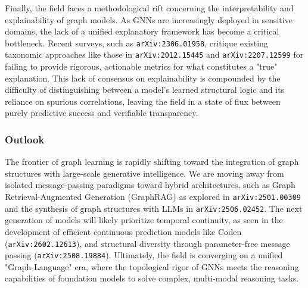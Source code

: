 \documentclass[11pt]{article}
\begin{document}
Finally, the field faces a methodological rift concerning the interpretability and explainability of graph models. As GNNs are increasingly deployed in sensitive domains, the lack of a unified explanatory framework has become a critical bottleneck. Recent surveys, such as \texttt{arXiv:2306.01958}, critique existing taxonomic approaches like those in \texttt{arXiv:2012.15445} and \texttt{arXiv:2207.12599} for failing to provide rigorous, actionable metrics for what constitutes a "true" explanation. This lack of consensus on explainability is compounded by the difficulty of distinguishing between a model's learned structural logic and its reliance on spurious correlations, leaving the field in a state of flux between purely predictive success and verifiable transparency.

\subsubsection{Outlook}

The frontier of graph learning is rapidly shifting toward the integration of graph structures with large-scale generative intelligence. We are moving away from isolated message-passing paradigms toward hybrid architectures, such as Graph Retrieval-Augmented Generation (GraphRAG) as explored in \texttt{arXiv:2501.00309} and the synthesis of graph structures with LLMs in \texttt{arXiv:2506.02452}. The next generation of models will likely prioritize temporal continuity, as seen in the development of efficient continuous prediction models like Coden (\texttt{arXiv:2602.12613}), and structural diversity through parameter-free message passing (\texttt{arXiv:2508.19884}). Ultimately, the field is converging on a unified "Graph-Language" era, where the topological rigor of GNNs meets the reasoning capabilities of foundation models to solve complex, multi-modal reasoning tasks.
\end{document}
